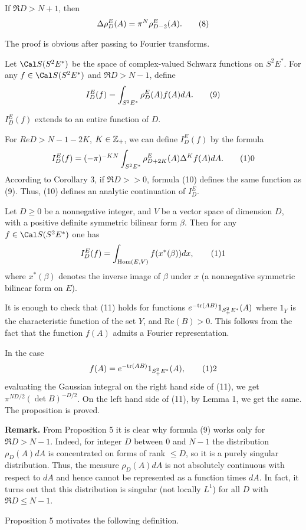  If $\Re D>N+1$, then 
$$
\Delta \rho^E_D(A)=\pi^N\rho^E_{D-2}(A).\tag 8
$$
\endproclaim

 The proof is obvious after passing to Fourier 
transforms.
\enddemo

Let $\Cal S(S^2E^*)$ be the space of complex-valued Schwarz 
functions on $S^2E^*$. 
For any $f\in \Cal S(S^2E^*)$ and $\Re D>N-1$, define
$$
I_D^E(f)=\int_{S^2E^*}\rho^E_D(A)f(A)dA.\tag 9
$$

$I_D^E(f)$ extends to an entire function of $D$.
\endproclaim

 For $Re D>N-1-2K$, $K\in \Bbb Z_+$, we can define 
$I_D^E(f)$ by the formula
$$
I_D^E(f)=(-\pi)^{-KN}\int_{S^2E^*}\rho^E_{D+2K}(A)\Delta^Kf(A)dA.\tag 10
$$
According to Corollary 3, if $\Re D>>0$, formula (10) defines the same
function as (9). Thus, (10) defines an analytic continuation of $I_D^E$. 
\enddemo

 Let $D\ge 0$ be a nonnegative integer, 
and $V$ be a vector space of dimension $D$, 
with a positive definite symmetric bilinear form $\beta$. 
Then for any $f\in \Cal S(S^2E^*)$ 
one has
$$
I_D^E(f)=\int_{\Hom(E,V)}f(x^*(\beta))dx,\tag 11
$$
where $x^*(\beta)$ denotes the inverse image of $\beta$ under $x$
(a nonnegative symmetric bilinear form on $E$).  
\endproclaim

 It is enough to check
that (11) holds for functions $e^{-{\text{tr}}(AB)}1_{S^2_+E^*}(A)$
where $1_Y$ is the characteristic function of the set $Y$, and
$\text{Re}(B)>0$. This follows from the fact 
that the function $f(A)$ admits a Fourier representation. 
 
In the case 
$$
f(A)=e^{-\tr(AB)}1_{S^2_+E^*}(A),\tag 12
$$
 evaluating the Gaussian integral 
on the right hand side of (11), we get $\pi^{ND/2}(\det B)^{-D/2}$.
On the left hand side of (11), by Lemma 1, we get the same. 
The proposition is proved. 
\enddemo

{\bf Remark.} From Proposition 5 it is clear why formula (9) works only for
$\Re D>N-1$. Indeed, for integer $D$ between $0$ and $N-1$ 
the distribution $\rho_D(A)dA$ is concentrated on forms of
rank $\le D$, so it is a purely singular distribution. 
Thus, the measure $\rho_D(A)dA$ is not absolutely continuous with respect
to $dA$ and hence cannot be represented as a function times $dA$. 
In fact, it turns out that this distribution is singular
(not locally $L^1$) 
for all $D$ with $\Re D\le N-1$. 

Proposition 5 motivates the following definition.

